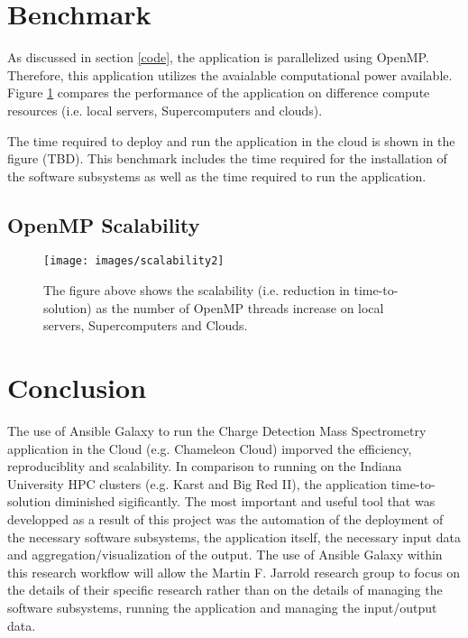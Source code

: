 \documentclass[9pt,twocolumn,twoside]{../../styles/osajnl}
\begin{document}
\section{Benchmark}
As discussed in section \ref{code}, the application is parallelized
using OpenMP. Therefore, this application utilizes the avaialable
computational power available. Figure \ref{fig:scalability2} compares the performance of the application on difference compute resources (i.e. local servers, Supercomputers and clouds). 

The time required to deploy and run the application in the cloud is
shown in the figure (TBD). This benchmark includes the time required
for the installation of the software subsystems as well as the time
required to run the application.  

\subsection{OpenMP Scalability} \label{scalability}
\begin{figure}
\centering
\texttt{[image: images/scalability2]}
\caption{The figure above shows the scalability (i.e. reduction in time-to-solution) as the number of OpenMP threads increase on local servers, Supercomputers and Clouds.}
\label{fig:scalability2}
\end{figure}

\section{Conclusion} \label{conclusion}
The use of Ansible Galaxy to run the Charge Detection Mass
Spectrometry application in the Cloud (e.g. Chameleon Cloud) imporved
the efficiency, reproduciblity and scalability. In comparison to
running on the Indiana University HPC clusters (e.g. Karst and Big Red
II), the application time-to-solution diminished sigificantly. The
most important and useful tool that was developped as a result of this
project was the automation of the deployment of the necessary software
subsystems, the application itself, the necessary input data and
aggregation/visualization of the output. The use of Ansible Galaxy
within this research workflow will allow the Martin F. Jarrold
research group to focus on the details of their specific research
rather than on the details of managing the software subsystems,
running the application and managing the input/output data.
\end{document}
